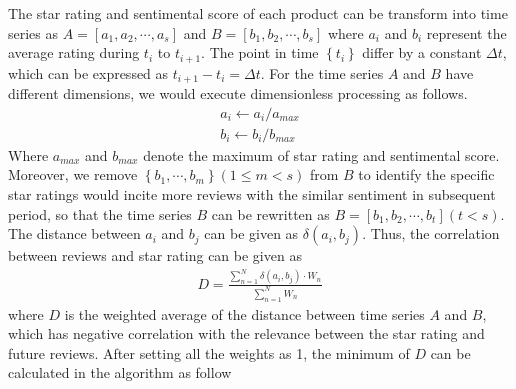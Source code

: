 \documentclass[12pt]{article}%
\begin{document}
The star rating and sentimental score of each product can be transform into time series as $A=[a_{1},a_{2},\cdots,a_{s}]$ and $B=[b_{1},b_{2},\cdots,b_{s}]$ where  $a_{i}$ and $b_{i}$  represent the average rating during $t_{i}$ to $t_{i+1}$. The point in time $\left \{ t_{i}  \right \}$ differ by a constant $\Delta t$, which can be expressed as $t_{i+1}-t_{i}=\Delta t$. 
For the time series $A$ and $B$ have different dimensions, we would execute dimensionless processing as follows.
\begin{gather*}
a_{i}\leftarrow a_{i}/a_{max}\\
b_{i}\leftarrow b_{i}/b_{max}
\end{gather*}
Where $a_{max}$ and $b_{max}$ denote the maximum of star rating and sentimental score. Moreover, we remove $\left \{b_{1},\cdots,b_{m}\right \}(1\leqslant m<s)$ from $B$ to identify the specific star ratings would incite more reviews with the similar sentiment in subsequent period, so that the time series $B$ can be rewritten as $B=[b_{1},b_{2},\cdots,b_{t}] (t<s)$. The distance between $a_{i}$ and $b_{j}$ can be given as $\delta(a_{i},b_{j})$. Thus, the correlation between reviews and star rating can be given as
\begin{gather}
 D=\frac{\sum_{n=1}^{N}\delta(a_{i},b_{j})\cdot W_{n}}{\sum_{n=1}^{N}W_{n}}
\end{gather}
where $D$ is the weighted average of the distance between time series $A$ and $B$, which has negative correlation with the relevance between the star rating and future reviews. After setting all the weights as 1, the minimum of $D$ can be calculated in the algorithm as follow%
\end{document}
